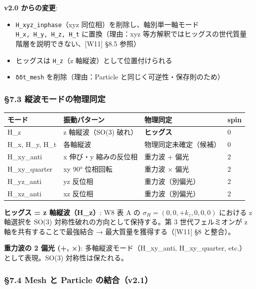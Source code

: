 \documentclass[a4paper,11pt]{ltjsarticle}
\providecommand{\tightlist}{\setlength{\itemsep}{0pt}\setlength{\parskip}{0pt}}
\newcounter{none}
\begin{document}
\textbf{v2.0 からの変更}:

\begin{itemize}
\tightlist
\item
  \texttt{H\_xyz\_inphase}（xyz 同位相）を削除し、軸別単一軸モード
  \texttt{H\_x,\ H\_y,\ H\_z,\ H\_t} に置換（理由：xyz
  等方解釈ではヒッグスの世代質量階層を説明できない、{[}W11{]} §8.5
  参照）
\item
  ヒッグスは \texttt{H\_z}（z 軸縦波）として位置付けられる
\item
  \texttt{δδt\_mesh} を削除（理由：Particle
  と同じく可逆性・保存則のため）
\end{itemize}

\subsubsection{§7.3
縦波モードの物理同定}\label{ux7e26ux6ce2ux30e2ux30fcux30c9ux306eux7269ux7406ux540cux5b9a}

{\def\LTcaptype{none} %
\begin{longtable}[]{@{}llll@{}}
\toprule\noalign{}
モード & 振動パターン & 物理同定 & spin \\
\midrule\noalign{}
\endhead
\bottomrule\noalign{}
\endlastfoot
H\_z & z 軸縦波（SO(3) 破れ） & \textbf{ヒッグス} & 0 \\
H\_x, H\_y, H\_t & 各軸縦波 & 物理同定未確定（候補） & 0 \\
H\_xy\_anti & x 伸び・y 縮みの反位相 & 重力波 + 偏光 & 2 \\
H\_xy\_quarter & xy 90° 位相回転 & 重力波 × 偏光 & 2 \\
H\_yz\_anti & yz 反位相 & 重力波（別偏光） & 2 \\
H\_xz\_anti & xz 反位相 & 重力波（別偏光） & 2 \\
\end{longtable}
}

\textbf{ヒッグス = z 軸縦波（H\_z）}: W8 表 A の
\(\sigma_H = (0, 0, +k_z, 0, 0, 0)\) における z 軸選択を SO(3)
対称性破れの方向として保持する。第 3 世代フェルミオンが z
軸を共有することで最強結合 → 最大質量を獲得する（{[}W11{]} §8 と整合）。

\textbf{重力波の 2 偏光 (+, ×)}: 多軸縦波モード（H\_xy\_anti,
H\_xy\_quarter, etc.）として表現。SO(3) 対称性は保たれる。

\subsubsection{§7.4 Mesh と Particle
の結合（v2.1）}\label{mesh-ux3068-particle-ux306eux7d50ux5408v2.1}
\end{document}

